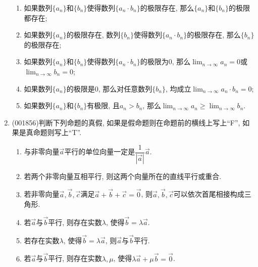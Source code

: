 \documentclass[10pt,a4paper]{article}
\newcommand{\blank}[1]{\underline{\hbox to #1pt{}}}
\begin{document}
\begin{enumerate}[1.]
\begin{enumerate}[\blank{20}(1)]
\item 如果数列$\{a_n\}$和$\{b_n\}$使得数列$\{a_n\cdot b_n\}$的极限存在, 那么$\{a_n\}$和$\{b_n\}$的极限都存在;\\ 
\item 如果数列$\{a_n\}$的极限存在, 数列$\{b_n\}$使得数列$\{a_n\cdot b_n\}$的极限存在, 那么$\{b_n\}$的极限存在;\\ 
\item 如果数列$\{a_n\}$和$\{b_n\}$使得数列$\{a_n\cdot b_n\}$的极限为$0$, 那么$\displaystyle\lim_{n\rightarrow \infty} a_n=0$或$\displaystyle\lim_{n\rightarrow \infty} b_n=0$;\\ 
\item 如果数列$\{a_n\}$的极限是$0$, 那么对任意数列$\{b_n\}$, 均成立$\displaystyle\lim_{n\rightarrow \infty} a_n\cdot b_n=0$;\\ 
\item 如果数列$\{a_n\}$和$\{b_n\}$有极限, 且$a_n>b_n$, 那么$\displaystyle\lim_{n\rightarrow \infty} a_n\geq\displaystyle\lim_{n\rightarrow \infty} b_n$.
\end{enumerate}
\item {\tiny (001856)}判断下列命题的真假, 如果是假命题则在命题前的横线上写上``F'', 如果是真命题则写上``T''.\\ 
\begin{enumerate}[\blank{30}(1)]
\item 与非零向量$\overrightarrow{a}$平行的单位向量一定是$\dfrac{1}{|\overrightarrow{a}|}\overrightarrow{a}$.\\ 
\item 若两个非零向量互相平行, 则这两个向量所在的直线平行或重合.\\ 
\item 若非零向量$\overrightarrow{a},\overrightarrow{b},\overrightarrow{c}$满足$\overrightarrow{a}+\overrightarrow{b}+\overrightarrow{c}=\overrightarrow{0}$, 则$\overrightarrow{a},\overrightarrow{b},\overrightarrow{c}$可以依次首尾相接构成三角形.\\ 
\item 若$\overrightarrow{a}$与$\overrightarrow{b}$平行, 则存在实数$\lambda$, 使得$\overrightarrow{b}=\lambda\overrightarrow{a}$.\\ 
\item 若存在实数$\lambda$, 使得$\overrightarrow{b}=\lambda\overrightarrow{a}$, 则$\overrightarrow{a}$与$\overrightarrow{b}$平行.\\ 
\item 若$\overrightarrow{a}$与$\overrightarrow{b}$平行, 则存在实数$\lambda,\mu$, 使得$\lambda\overrightarrow{a}+\mu\overrightarrow{b}=\overrightarrow{0}$.\\ 

\end{enumerate}
\end{enumerate}
\end{document}
